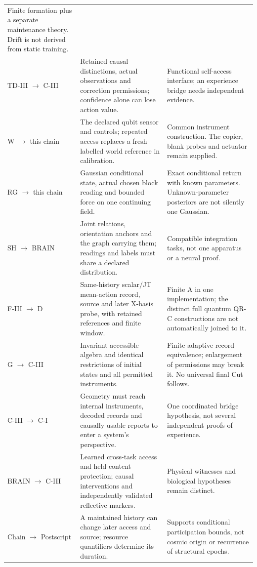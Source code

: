 \documentclass[11pt,a4paper]{article}
\begin{document}
\begin{longtable}{@{}P{.18\textwidth}P{.44\textwidth}P{.32\textwidth}@{}}
Finite formation plus a separate maintenance theory. Drift is not
derived from static training.\\
TD-III $\to$ C-III \cite{TDOMEIII,PaperIII} &
Retained causal distinctions, actual observations and correction
permissions; confidence alone can lose action value. &
Functional self-access interface; an experience bridge needs
independent evidence.\\
W $\to$ this chain \cite{WorldImprint} &
The declared qubit sensor and controls; repeated access replaces a
fresh labelled world reference in calibration. &
Common instrument construction. The copier, blank probes and actuator
remain supplied.\\
RG $\to$ this chain \cite{ImprintRG} &
Gaussian conditional state, actual chosen block reading and bounded
force on one continuing field. &
Exact conditional return with known parameters. Unknown-parameter
posteriors are not silently one Gaussian.\\
SH $\to$ BRAIN \cite{StableHulls,BrainAnchor} &
Joint relations, orientation anchors and the graph carrying them;
readings and labels must share a declared distribution. &
Compatible integration tasks, not one apparatus or a neural proof.\\
F-III $\to$ D \cite{FoundationIII,HAFFD} &
Same-history scalar/JT mean-action record, source and later X-basis
probe, with retained references and finite window. &
Finite A in one implementation; the distinct full quantum QR-C
constructions are not automatically joined to it.\\
G $\to$ C-III \cite{HAFFG,PaperIII} &
Invariant accessible algebra and identical restrictions of initial
states and all permitted instruments. &
Finite adaptive record equivalence; enlargement of permissions may
break it. No universal final Cut follows.\\
C-III $\to$ C-I \cite{PaperIII,PaperI} &
Geometry must reach internal instruments, decoded records and
causally usable reports to enter a system's perspective. &
One coordinated bridge hypothesis, not several independent proofs of
experience.\\
BRAIN $\to$ C-III \cite{BrainAnchor,PaperIII} &
Learned cross-task access and held-content protection; causal
interventions and independently validated reflective markers. &
Physical witnesses and biological hypotheses remain distinct.\\
Chain $\to$ Postscript \cite{Postscript} &
A maintained history can change later access and source; resource
quantifiers determine its duration. &
Supports conditional participation bounds, not cosmic origin or
recurrence of structural epochs.\\
\bottomrule
\end{longtable}
\endgroup
\end{document}
